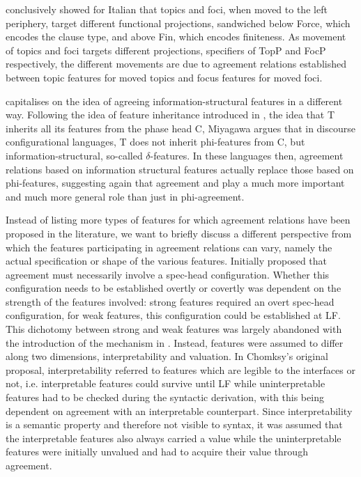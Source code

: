 \documentclass[output=paper
,modfonts
,nonflat]{langsci/langscibook}
\begin{document}
\citet{Rizzi1997} conclusively showed for Italian that topics and foci, when moved to the left periphery, target different functional projections, sandwiched below Force, which encodes the clause type, and above Fin, which encodes finiteness. As movement of topics and foci targets different projections, specifiers of TopP and FocP respectively, the different movements are due to agreement relations established between topic features for moved topics and focus features for moved foci.

\citet{Miyagawa2010,Miyagawa2017} capitalises on the idea of agreeing information-struc\-tur\-al features in a different way. Following the idea of feature inheritance introduced in \citet{Chomsky2008}, the idea that T inherits all its features from the phase head C, Miyagawa argues that in discourse configurational languages, T does not inherit phi-fea\-tures from C, but information-structural, so-called $\delta$-features. In these languages then, agreement relations based on information structural features actually replace those based on phi-fea\-tures, suggesting again that agreement and {\agr} play a much more important and much more general role than just in phi-agreement.

Instead of listing more types of features for which agreement relations have been proposed in the literature, we want to briefly discuss a different perspective from which the features participating in agreement relations can vary, namely the actual specification or shape of the various features.
Initially \citet{Chomsky1995} proposed that agreement must necessarily involve a spec-head configuration. Whether this configuration needs to be established overtly or covertly was dependent on the strength of the features involved: strong features required an overt spec-head configuration, for weak features, this configuration could be established at LF. This dichotomy between strong and weak features was largely abandoned with the introduction of the \agr{} mechanism in \citet{Chomsky2000,Chomsky2001}. Instead, features were assumed to differ along two dimensions, interpretability and valuation. In Chomksy's original proposal, interpretability referred to features which are legible to the interfaces or not, i.e. interpretable features could survive until LF while uninterpretable features had to be checked during the syntactic derivation, with this being dependent on agreement with an interpretable counterpart. Since interpretability is a semantic property and therefore not visible to syntax, it was assumed that the interpretable features also always carried a value while the uninterpretable features were initially unvalued and had to acquire their value through agreement.
\end{document}
